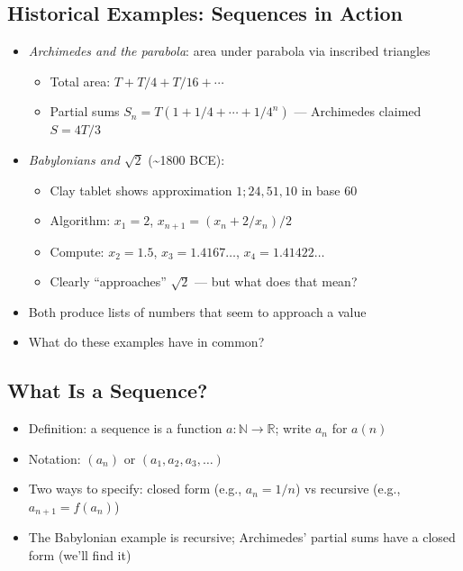 \documentclass[
  10pt,
  letterpaper,
]{scrbook}
\providecommand{\tightlist}{%
  \setlength{\itemsep}{0pt}\setlength{\parskip}{0pt}}
\newcommand{\NN}{\mathbb{N}}
\newcommand{\RR}{\mathbb{R}}
\begin{document}
\subsection{Historical Examples: Sequences in
Action}\label{historical-examples-sequences-in-action}

\begin{itemize}
\tightlist
\item
  \emph{Archimedes and the parabola}: area under parabola via inscribed
  triangles

  \begin{itemize}
  \tightlist
  \item
    Total area: \(T + T/4 + T/16 + \cdots\)
  \item
    Partial sums \(S_n = T(1 + 1/4 + \cdots + 1/4^n)\) --- Archimedes
    claimed \(S = 4T/3\)
  \end{itemize}
\item
  \emph{Babylonians and \(\sqrt{2}\)} (\textasciitilde1800 BCE):

  \begin{itemize}
  \tightlist
  \item
    Clay tablet shows approximation \(1;24,51,10\) in base 60
  \item
    Algorithm: \(x_1 = 2\), \(x_{n+1} = (x_n + 2/x_n)/2\)
  \item
    Compute: \(x_2 = 1.5\), \(x_3 = 1.4167\ldots\),
    \(x_4 = 1.41422\ldots\)
  \item
    Clearly ``approaches'' \(\sqrt{2}\) --- but what does that mean?
  \end{itemize}
\item
  Both produce lists of numbers that seem to approach a value
\item
  What do these examples have in common?
\end{itemize}

\subsection{What Is a Sequence?}\label{what-is-a-sequence}

\begin{itemize}
\tightlist
\item
  Definition: a sequence is a function \(a: \NN \to \RR\); write \(a_n\)
  for \(a(n)\)
\item
  Notation: \((a_n)\) or \((a_1, a_2, a_3, \ldots)\)
\item
  Two ways to specify: closed form (e.g., \(a_n = 1/n\)) vs recursive
  (e.g., \(a_{n+1} = f(a_n)\))
\item
  The Babylonian example is recursive; Archimedes' partial sums have a
  closed form (we'll find it)
\end{itemize}
\end{document}
